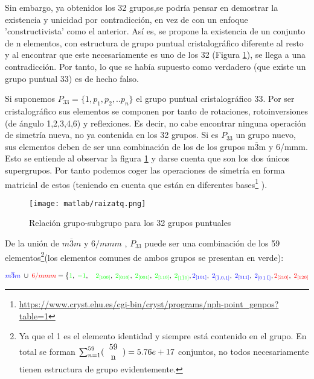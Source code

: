 \documentclass{report}
\begin{document}
 Sin embargo, ya obtenidos los 32 grupos,se podría pensar en demostrar la existencia y unicidad por contradicción, en vez de con un enfoque 'constructivista' como el anterior. Así es, se propone la existencia de un conjunto de n elementos, con estructura de grupo puntual cristalográfico diferente al resto y al encontrar que este necesariamente es uno de los 32 (Figura \ref{rai}), se llega a una contradicción. Por tanto, lo que se había supuesto como verdadero (que existe un grupo puntual 33) es de hecho falso.\\
\vspace{.2cm}

Si suponemos $P_{33}=\{1,p_1,p_2,..p_n\}$ el grupo puntual cristalográfico 33. Por ser cristalográfico sus elementos se componen por tanto de rotaciones, rotoinversiones 
(de ángulo 1,2,3,4,6) 
y reflexiones.  Es decir, no cabe encontrar ninguna operación  de simetría nueva, no ya contenida en los 32 grupos. Si es $P_{33}$ un grupo nuevo, sus elementos deben de ser una combinación de los de los grupos m$\overline{3}$m y 6/mmm. Esto se entiende al observar la figura \ref{rai} y darse cuenta que son los dos únicos supergrupos. Por tanto podemos coger las operaciones de símetría en forma matricial de estos (teniendo en cuenta que están en diferentes bases\footnote{\url{https://www.cryst.ehu.es/cgi-bin/cryst/programs/nph-point_genpos?table=1}} ).
\vspace{.2cm}




\begin{figure}[h!]
\raggedright
\texttt{[image: matlab/raizatq.png]} 
\caption{Relación grupo-subgrupo para los 32 grupos puntuales} 
\label{rai}
\end{figure}


De la unión de $m\overline{3}m$ y $6/mmm$ , $P_{33}$ puede ser una combinación de los 59 elementos\footnote{Ya que el 1 es el elemento identidad y siempre está contenido en el grupo. En total se forman $\sum_{n=1}^{59} (\begin{tabular}{c}
59 \\ 
n \\ 
\end{tabular} )=5.76e+17$ conjuntos, no todos necesariamente tienen estructura de grupo evidentemente. }(los elementos comunes de ambos grupos se presentan en verde): 



\[
\textcolor{blue}{m\overline{3}m} \;\cup\;\textcolor{red}{ 6/mmm}
=\bigl\{
\textcolor{green}{1},\;\textcolor{green}{-1},
\quad
\textcolor{green}{2_{[100]}},\;\textcolor{green}{2_{[010]}},\;\textcolor{green}{2_{[001]}},
\;\textcolor{green}{2_{[110]}},\;\textcolor{green}{2_{[1\bar{1}0]}},
\textcolor{blue}{2_{[101]}},\;\textcolor{blue}{2_{[\bar{1},0,1]}},
\;\textcolor{blue}{2_{[011]}},\;\textcolor{blue}{2_{[0\,1\,\bar{1}]}},
\textcolor{red}{2_{[210]}},\;\textcolor{red}{2_{[120]}}
\]
\end{document}
